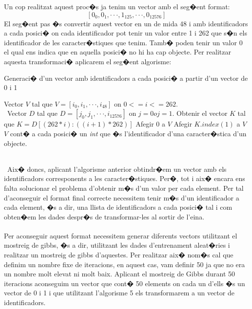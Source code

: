 \documentclass[12pt,a4paper,openright,oneside]{article}
\numberwithin{equation}{section}
\theoremstyle{definition}
\begin{document}
Un cop realitzat aquest proc�s ja tenim un vector amb el seg�ent format:
\[ [0_0,0_1, \cdot\cdot\cdot, 1_{125}, \cdot\cdot\cdot, 0_{12576}]\]
El seg�ent pas �s convertir aquest vector en un de mida 48 i amb identificadors a cada posici� on cada identificador pot tenir un valor entre 1 i 262 que s�n els identificador de les caracter�stiques que tenim. Tamb� poden tenir un valor 0 el qual ens indica que en aquella posici� no hi ha cap objecte. Per realitzar aquesta transformaci� aplicarem el seg�ent algorisme:
\begin{algorithm}
\caption{Generaci� d'un vector amb identificadors a cada posici� a partir d'un vector de 0 i 1}
\begin{algorithmic} 
\STATE Vector ${V}$ tal que ${V = [i_0,i_1, \cdot \cdot \cdot, i_{48}]}$ on ${ 0 <= i <= 262}$. \\\ 
Vector ${D}$ tal que ${D = [j_0,j_1, \cdot \cdot \cdot, i_{12576}]}$ on ${ j = 0 o j = 1}$.
\FOR{$i = 1 \cdot \cdot \cdot 48$} 
\STATE Obtenir el vector ${K}$ tal que ${K = D[(262 * i):((i + 1) * 262)]}$
\IF{${K}$ no cont� 1}
\STATE Afegir 0 a ${V}$
\ELSE 
\STATE Afegir ${K.index(1)}$ a ${V}$
\ENDIF
\ENDFOR \\
${V}$ cont� a cada posici� un \textit{int} que �s l'identificador d'una caracter�stica d'un objecte.
\end{algorithmic}
\end{algorithm} \\\
Aix� doncs, aplicant l'algorisme anterior obtindr�em un vector amb els identificadors corresponents a les caracter�stiques. Per�, tot i aix� encara ens falta solucionar el problema d'obtenir m�s d'un valor per cada element. Per tal d'aconseguir el format final correcte necessitem tenir m�s d'un identificador a cada element, �s a dir, una llista de identificadors a cada posici� tal i com obten�em les dades despr�s de transformar-les al sortir de l'eina.\\\\
Per aconseguir aquest format necessitem generar diferents vectors utilitzant el mostreig de gibbs, �s a dir, utilitzant les dades d'entrenament aleat�ries i realitzar un mostreig de gibbs d'aquestes. Per realitzar aix� nom�s cal que definim un nombre fixe de iteracions, en aquest cas, vam definir 50 ja que no era un nombre molt elevat ni molt baix. Aplicant el mostreig de Gibbs durant 50 iteracions aconseguim un vector que cont� 50 elements on cada un d'ells �s un vector de 0 i 1 i que utilitzant l'algorisme 5 els transformarem a un vector de identificadors.\\\\
\end{document}
